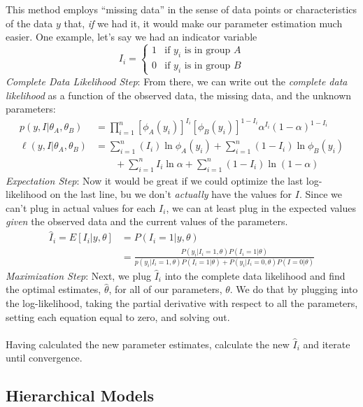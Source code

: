 \documentclass[12pt]{article}
\theoremstyle{plain}
\theoremstyle{definition}
\theoremstyle{remark}
\begin{document}
This method employs ``missing data'' in the sense of data points
or characteristics of the data $y$ that, \emph{if} we had it, it
would make our parameter estimation much easier. One example,
let's say we had an indicator variable
\[ I_i = \begin{cases} 1 & \text{if $y_i$ is in group $A$} \\
      0 & \text{if $y_i$ is in group $B$} \end{cases} \]
      {\sl Complete Data Likelihood Step}:
From there, we can write out the \emph{complete data likelihood}
as a function of the observed data, the missing data, and the unknown
parameters:
\begin{align*}
    p(y, I | \theta_A, \theta_B) &= \prod^n_{i=1}
      \left[  \phi_A(y_i)\right]^{I_i}
      \left[\phi_B(y_i) \right]^{1-I_i} \alpha^{I_i}(1-\alpha)^{1-I_i}
      \\
   \ell(y,I|\theta_A, \theta_B) &= \sum^n_{i=1} (I_i) \ln \phi_A(y_i)
   + \sum^n_{i=1} (1-I_i) \ln \phi_B(y_i)  \\
   &\qquad +
   \sum^n_{i=1} I_i \ln \alpha +\sum^n_{i=1} (1-I_i) \ln (1-\alpha)
\end{align*}
{\sl Expectation Step}:
Now it would be great if we could optimize the last log-likelihood
on the last line, bu we don't \emph{actually} have the values for
$I$. Since we can't plug in actual values for
each $I_i$, we can at least plug in the expected values \emph{given}
the observed data and the current values of the parameters.
\begin{align*}
   \hat{I}_i = E[I_i | y, \theta] &= P(I_i=1 | y, \theta)\\
   &= \frac{ P(y_i | I_i = 1, \theta) P(I_i=1 | \theta)}{
      p(y_i|I_i = 1, \theta) P(I_i=1 |\theta) +
      P(y_i|I_i=0, \theta) P(I=0|\theta)}
\end{align*}
{\sl Maximization Step}: Next, we plug $\hat{I}_i$ into the complete
data likelihood and find the optimal estimates, $\hat{\theta}$,
for all of our parameters, $\theta$. We do that by plugging into
the log-likelihood, taking the partial derivative with respect to all
the parameters, setting each equation equal to zero, and solving out.
\\
\\
Having calculated the new parameter estimates, calculate the new
$\hat{I}_i$ and iterate until convergence.


\newpage
\subsection{Hierarchical Models}
\end{document}
